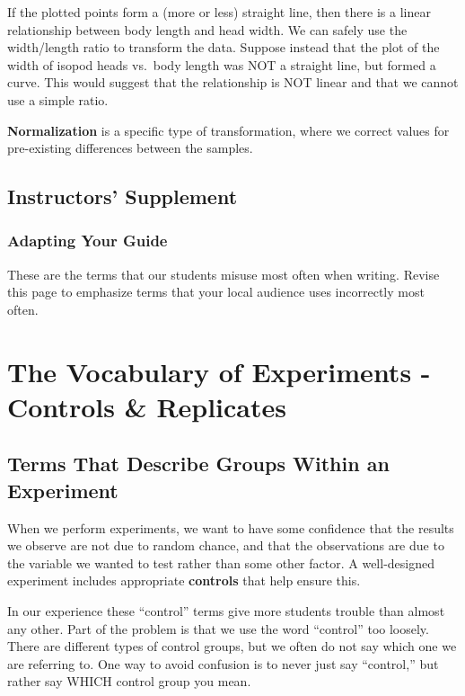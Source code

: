 \documentclass[
]{book}
\begin{document}
If the plotted points form a (more or less) straight line, then there is a linear relationship between body length and head width. We can safely use the width/length ratio to transform the data. Suppose instead that the plot of the width of isopod heads vs.~body length was NOT a straight line, but formed a curve. This would suggest that the relationship is NOT linear and that we cannot use a simple ratio.

\textbf{Normalization} is a specific type of transformation, where we correct values for pre-existing differences between the samples.

\hypertarget{instructors-supplement}{%
\section{Instructors' Supplement}\label{instructors-supplement}}

\hypertarget{adapting-your-guide}{%
\subsection{Adapting Your Guide}\label{adapting-your-guide}}

These are the terms that our students misuse most often when writing. Revise this page to emphasize terms that your local audience uses incorrectly most often.

\hypertarget{replicates220}{%
\chapter{The Vocabulary of Experiments - Controls \& Replicates}\label{replicates220}}

\hypertarget{terms-that-describe-groups-within-an-experiment}{%
\section{Terms That Describe Groups Within an Experiment}\label{terms-that-describe-groups-within-an-experiment}}

When we perform experiments, we want to have some confidence that the results we observe are not due to random chance, and that the observations are due to the variable we wanted to test rather than some other factor. A well-designed experiment includes appropriate \textbf{controls} that help ensure this.

In our experience these ``control'' terms give more students trouble than almost any other. Part of the problem is that we use the word ``control'' too loosely. There are different types of control groups, but we often do not say which one we are referring to. One way to avoid confusion is to never just say ``control,'' but rather say WHICH control group you mean.
\end{document}
